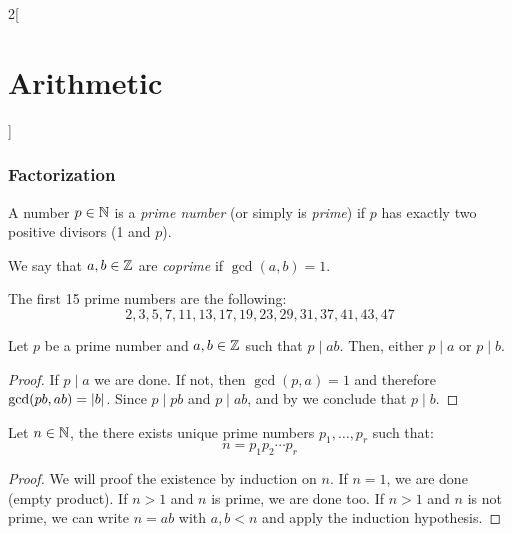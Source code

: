 \documentclass[../../../main_math.tex]{subfiles}
\begin{document}
\begin{multicols}{2}[\section{Arithmetic}]
  \subsubsection{Factorization}
  \begin{definition}
    A number $p\in\mathbb{N}$ is a \emph{prime number} (or simply is \emph{prime}) if $p$ has exactly two positive divisors (1 and $p$).
  \end{definition}
  \begin{definition}
    We say that $a,b\in\mathbb{Z}$ are \emph{coprime} if $\gcd(a,b)=1$.
  \end{definition}
  \begin{remark}
    The first 15 prime numbers are the following: $$2, 3, 5, 7, 11, 13, 17, 19, 23, 29, 31, 37, 41, 43, 47$$
  \end{remark}
  \begin{theorem}
    Let $p$ be a prime number and $a,b\in \mathbb{Z}$ such that $p\mid ab$. Then, either $p\mid a$ or $p\mid b$.
  \end{theorem}
  \begin{proof}
    If $p\mid a$ we are done. If not, then $\gcd(p,a)=1$ and therefore $\gcd(pb,ab)=\abs{b}$. Since $p\mid pb$ and $p\mid ab$, and by  we conclude that $p\mid b$.
  \end{proof}
  \begin{important}
    \begin{theorem}\label{A:fundamentalthm}
      Let $n\in\mathbb{N}$, the there exists unique prime numbers $p_1,\ldots, p_r$ such that: $$n=p_1p_2\cdots p_r$$
    \end{theorem}
  \end{important}
  \begin{proof}
    We will proof the existence by induction on $n$. If $n=1$, we are done (empty product). If $n>1$ and $n$ is prime, we are done too. If $n>1$ and $n$ is not prime, we can write $n=ab$ with $a,b<n$ and apply the induction hypothesis.


\end{proof}
\end{multicols}
\end{document}
